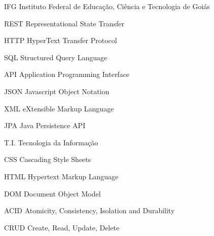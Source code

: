 \begin{siglas}
  \item [IFG] Instituto Federal de Educação, Ciência e Tecnologia de Goiás 
  \item [REST] Representational State Transfer
  \item [HTTP] HyperText Transfer Protocol
  \item [SQL] Structured Query Language
  \item [API] Application Programming Interface
  \item [JSON] Javascript Object Notation
  \item [XML] eXtensible Markup Language
  \item [JPA] Java Persistence API
  \item [T.I.] Tecnologia da Informação
  \item [CSS] Cascading Style Sheets
  \item [HTML] Hypertext Markup Language
  \item [DOM] Document Object Model
  \item [ACID] Atomicity, Consistency, Isolation and Durability
  \item [CRUD] Create, Read, Update, Delete
\end{siglas}
